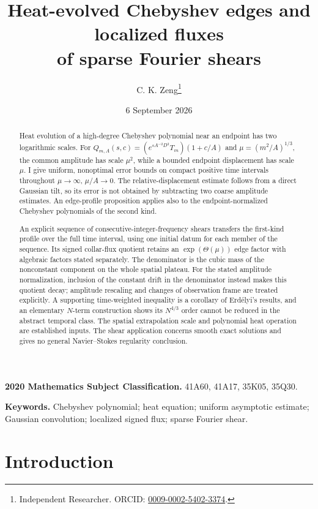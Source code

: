 \documentclass[11pt]{article}
\title{Heat-evolved Chebyshev edges and localized fluxes\\
of sparse Fourier shears}
\author{C. K. Zeng\thanks{Independent Researcher.
ORCID: \href{https://orcid.org/0009-0002-5402-3374}{0009-0002-5402-3374}.}}
\date{6 September 2026}
\theoremstyle{definition}
\begin{document}
\maketitle

\begin{abstract}
Heat evolution of a high-degree Chebyshev polynomial near an endpoint
has two logarithmic scales. For
$Q_{m,A}(s,c)=(e^{sA^{-2}D^2}T_m)(1+c/A)$ and
$\mu=(m^2/A)^{1/3}$, the common amplitude has scale $\mu^2$,
while a bounded endpoint displacement has scale $\mu$.
I give uniform, nonoptimal error bounds on compact positive time
intervals throughout $\mu\to\infty$, $\mu/A\to0$.
The relative-displacement estimate follows from a direct Gaussian tilt,
so its error is not obtained by subtracting two coarse amplitude estimates.
An edge-profile proposition applies also to the endpoint-normalized
Chebyshev polynomials of the second kind.

An explicit sequence of consecutive-integer-frequency shears transfers
the first-kind profile over the full time interval, using one initial
datum for each member of the sequence. Its signed collar-flux quotient retains an
$\exp(\Theta(\mu))$ edge factor with algebraic factors stated separately.
The denominator is the cubic mass of the nonconstant component on the
whole spatial plateau. For the stated amplitude normalization, inclusion
of the constant drift in the denominator instead makes this quotient
decay; amplitude rescaling and changes of observation frame are treated
explicitly. A supporting time-weighted inequality is a corollary of
Erd\'elyi's results, and an elementary $N$-term construction shows its
$N^{4/3}$ order cannot be reduced in the abstract temporal class.
The spatial extrapolation scale and polynomial heat operation are
established inputs. The shear application concerns smooth exact solutions
and gives no general Navier--Stokes regularity conclusion.
\end{abstract}

\medskip
\noindent\textbf{2020 Mathematics Subject Classification.}
41A60, 41A17, 35K05, 35Q30.

\noindent\textbf{Keywords.}
Chebyshev polynomial; heat equation; uniform asymptotic estimate;
Gaussian convolution; localized signed flux; sparse Fourier shear.

\section{Introduction}\label{sec:introduction}
\end{document}
